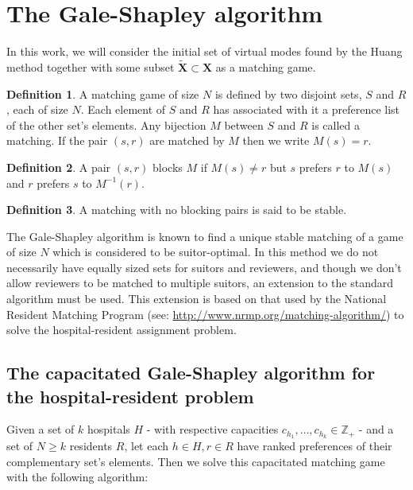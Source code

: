 \documentclass{article}
\theoremstyle{definition}
\newtheorem{definition}{Definition}[section]
\begin{document}
\section{The Gale-Shapley algorithm}\label{section:galeshapley}

In this work, we will consider the initial set of virtual modes  found by the Huang method together with some subset $\tilde{\textbf{X}} \subset \textbf{X}$ as a matching game.

\begin{definition}\label{def:matching-game}
	A matching game of size $N$ is defined by two disjoint sets, $S$ and $R$, each of size $N$. Each element of $S$ and $R$ has associated with it a preference list of the other set's elements. Any bijection $M$ between $S$ and $R$ is called a matching. If the pair $(s,r)$ are matched by $M$ then we write $M(s) = r$.
\end{definition} 

\begin{definition}\label{def:blocking-pair}	
	A pair $(s,r)$ blocks $M$ if $M(s) \ne r$ but $s$ prefers $r$ to $M(s)$ and $r$ prefers $s$ to $M^{-1}(r)$.
\end{definition}

\begin{definition}\label{def:stable-matching}
	A matching with no blocking pairs is said to be stable.
\end{definition}

The Gale-Shapley algorithm is known to find a unique stable matching of a game of size $N$ which is considered to be suitor-optimal. In this method we do not necessarily have equally sized sets for suitors and reviewers, and though we don't allow reviewers to be matched to multiple suitors, an extension to the standard algorithm must be used. This extension is based on that used by the National Resident Matching Program (see: \url{http://www.nrmp.org/matching-algorithm/}) to solve the hospital-resident assignment problem.  \\

\subsection{The capacitated Gale-Shapley algorithm for the hospital-resident problem}\label{subsection:capacitated-galeshapley}

Given a set of $k$ hospitals $H$ - with respective capacities $c_{h_1}, \ldots, c_{h_k} \in \mathbb{Z}_+$ - and a set of $N \ge k$ residents $R$, let each $h \in H, r \in R$ have ranked preferences of their complementary set's elements. Then we solve this capacitated matching game with the following algorithm:
\end{document}
